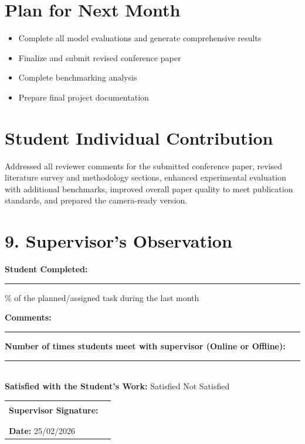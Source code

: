 \documentclass[12pt,a4paper]{article}
\begin{document}
\section{Plan for Next Month}
\begin{itemize}[leftmargin=*]
    \item Complete all model evaluations and generate comprehensive results
    \item Finalize and submit revised conference paper
    \item Complete benchmarking analysis
    \item Prepare final project documentation
\end{itemize}


\section{Student Individual Contribution}
Addressed all reviewer comments for the submitted conference paper, revised literature survey and methodology sections, enhanced experimental evaluation with additional benchmarks, improved overall paper quality to meet publication standards, and prepared the camera-ready version.

\section*{9. Supervisor's Observation}

\noindent\textbf{Student Completed:} \rule{3cm}{0.4pt}\% 
of the planned/assigned task during the last month

\vspace{0.5cm}

\noindent\textbf{Comments:}

\vspace{2cm}
\noindent\rule{\textwidth}{0.4pt}

\vspace{0.5cm}

\noindent\textbf{Number of times students meet with supervisor (Online or Offline):} \rule{1cm}{0.4pt} \\

\noindent\textbf{Satisfied with the Student's Work:} 
\hspace{0.5cm}  Satisfied 
\hspace{1cm}  Not Satisfied

\vspace{0.5cm}



\vspace{1.5cm}

\noindent\begin{tabular}{p{7cm} p{6cm}}
\textbf{Supervisor Signature:} & \rule{5cm}{0.4pt} \\
\\

\textbf{Date:} 25/02/2026
\end{tabular}

\vspace{0.8cm}
\end{document}
